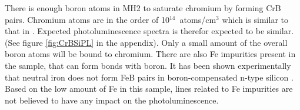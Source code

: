 There is enough boron atoms in MH2 to saturate chromium by forming CrB pairs. Chromium atoms are in the order of 10$^{14}$~atoms/cm$^3$ which is similar to that in \cite{conzelmann82}. Expected photoluminescence spectra is therefor expected to be similar. (See figure \ref{fig:CrBSiPL} in the appendix). Only a small amount of the overall boron atoms will be bound to chromium. There are also Fe impurities present in the sample, that can form bonds with boron. It has been shown experimentally that neutral iron does not form FeB pairs in boron-compensated n-type silicon \cite{lemke81}. Based on the low amount of Fe in this sample, lines related to Fe impurities are not believed to have any impact on the photoluminescence. 

